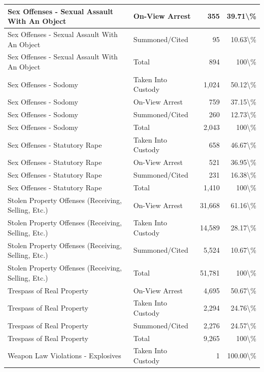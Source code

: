 \documentclass[
]{krantz}
\begin{document}
\begin{longtable}[t]{l|l|r|r}
\hline
Sex Offenses - Sexual Assault With An Object & On-View Arrest & 355 & 39.71\textbackslash{}\%\\
\hline
Sex Offenses - Sexual Assault With An Object & Summoned/Cited & 95 & 10.63\textbackslash{}\%\\
\hline
Sex Offenses - Sexual Assault With An Object & Total & 894 & 100\textbackslash{}\%\\
\hline
Sex Offenses - Sodomy & Taken Into Custody & 1,024 & 50.12\textbackslash{}\%\\
\hline
Sex Offenses - Sodomy & On-View Arrest & 759 & 37.15\textbackslash{}\%\\
\hline
Sex Offenses - Sodomy & Summoned/Cited & 260 & 12.73\textbackslash{}\%\\
\hline
Sex Offenses - Sodomy & Total & 2,043 & 100\textbackslash{}\%\\
\hline
Sex Offenses - Statutory Rape & Taken Into Custody & 658 & 46.67\textbackslash{}\%\\
\hline
Sex Offenses - Statutory Rape & On-View Arrest & 521 & 36.95\textbackslash{}\%\\
\hline
Sex Offenses - Statutory Rape & Summoned/Cited & 231 & 16.38\textbackslash{}\%\\
\hline
Sex Offenses - Statutory Rape & Total & 1,410 & 100\textbackslash{}\%\\
\hline
Stolen Property Offenses (Receiving, Selling, Etc.) & On-View Arrest & 31,668 & 61.16\textbackslash{}\%\\
\hline
Stolen Property Offenses (Receiving, Selling, Etc.) & Taken Into Custody & 14,589 & 28.17\textbackslash{}\%\\
\hline
Stolen Property Offenses (Receiving, Selling, Etc.) & Summoned/Cited & 5,524 & 10.67\textbackslash{}\%\\
\hline
Stolen Property Offenses (Receiving, Selling, Etc.) & Total & 51,781 & 100\textbackslash{}\%\\
\hline
Trespass of Real Property & On-View Arrest & 4,695 & 50.67\textbackslash{}\%\\
\hline
Trespass of Real Property & Taken Into Custody & 2,294 & 24.76\textbackslash{}\%\\
\hline
Trespass of Real Property & Summoned/Cited & 2,276 & 24.57\textbackslash{}\%\\
\hline
Trespass of Real Property & Total & 9,265 & 100\textbackslash{}\%\\
\hline
Weapon Law Violations - Explosives & Taken Into Custody & 1 & 100.00\textbackslash{}\%\\

\end{longtable}
\end{document}
